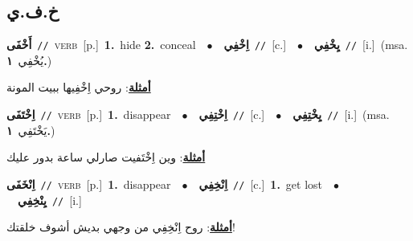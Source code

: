 \documentclass[10pt,a4paper,twoside]{article} %
\begin{document}
\begin{multicols}{2}
\vspace{-3mm}
\subsection*{\color{blue}\foreignlanguage{arabic}{خ.ف.ي}\color{blue}{}} 

{\setlength\topsep{0pt}\textbf{\foreignlanguage{arabic}{أَخْفَى}}\ {\color{gray}\texttt{//}\color{black}}\ \textsc{verb}\ [p.]\ \textbf{1.}~hide  \textbf{2.}~conceal\ \ $\bullet$\ \ \setlength\topsep{0pt}\textbf{\foreignlanguage{arabic}{اِخْفِي}}\ {\color{gray}\texttt{//}\color{black}}\ [c.]\ \ $\bullet$\ \ \setlength\topsep{0pt}\textbf{\foreignlanguage{arabic}{يِخْفِي}}\ {\color{gray}\texttt{//}\color{black}}\ [i.]\ \color{gray}(msa. \foreignlanguage{arabic}{يُخْفِي}~\foreignlanguage{arabic}{\textbf{١.}})\color{black}\  \begin{flushright}\color{gray}\foreignlanguage{arabic}{\textbf{\underline{\foreignlanguage{arabic}{أمثلة}}}: روحي اِخْفِيها ببيت المونة}\end{flushright}\color{black}} \vspace{2mm}

{\setlength\topsep{0pt}\textbf{\foreignlanguage{arabic}{اِخْتَفَى}}\ {\color{gray}\texttt{//}\color{black}}\ \textsc{verb}\ [p.]\ \textbf{1.}~disappear\ \ $\bullet$\ \ \setlength\topsep{0pt}\textbf{\foreignlanguage{arabic}{اِخْتِفِي}}\ {\color{gray}\texttt{//}\color{black}}\ [c.]\ \ $\bullet$\ \ \setlength\topsep{0pt}\textbf{\foreignlanguage{arabic}{يِخْتِفِي}}\ {\color{gray}\texttt{//}\color{black}}\ [i.]\ \color{gray}(msa. \foreignlanguage{arabic}{يَخْتَفِي}~\foreignlanguage{arabic}{\textbf{١.}})\color{black}\  \begin{flushright}\color{gray}\foreignlanguage{arabic}{\textbf{\underline{\foreignlanguage{arabic}{أمثلة}}}: وين اِخْتَفيت صارلي ساعة بدور عليك}\end{flushright}\color{black}} \vspace{2mm}

{\setlength\topsep{0pt}\textbf{\foreignlanguage{arabic}{اِنْخَفَى}}\ {\color{gray}\texttt{//}\color{black}}\ \textsc{verb}\ [p.]\ \textbf{1.}~disappear\ \ $\bullet$\ \ \setlength\topsep{0pt}\textbf{\foreignlanguage{arabic}{اِنْخِفِي}}\ {\color{gray}\texttt{//}\color{black}}\ [c.]\ \textbf{1.}~get lost\ \ $\bullet$\ \ \setlength\topsep{0pt}\textbf{\foreignlanguage{arabic}{يِنْخِفِي}}\ {\color{gray}\texttt{//}\color{black}}\ [i.]\  \begin{flushright}\color{gray}\foreignlanguage{arabic}{\textbf{\underline{\foreignlanguage{arabic}{أمثلة}}}: روح اِنْخِفِي من وجهي بديش أشوف خلقتك!}\end{flushright}\color{black}} \vspace{2mm}


\end{multicols}
\end{document}
